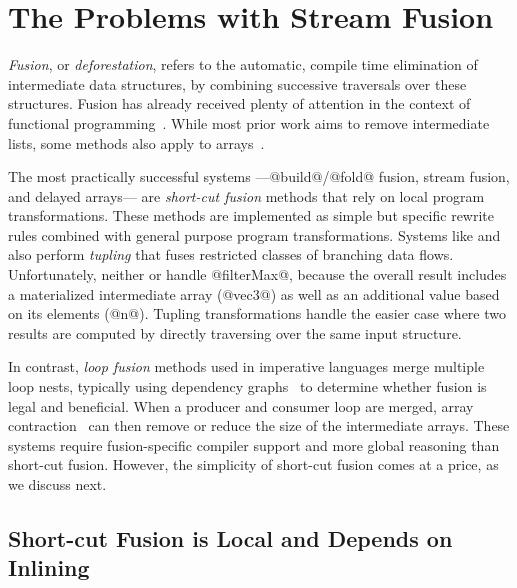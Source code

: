 \section{The Problems with Stream Fusion}
\label{s:Problems}

\emph{Fusion}, or \emph{deforestation}, refers to the automatic, compile time elimination of intermediate data structures, by combining successive traversals over these structures. Fusion has already received plenty of attention in the context of functional programming~\cite{Wadler:listnessness,Meijer:bananas,Waters:series-expressions,Gill:short-cut,Coutts:stream-fusion,Hu:Tupling,Romph:Scala}. While most prior work aims to remove intermediate lists, some methods also apply to arrays~\cite{Chakravarty:functional-array-fusion,Keller:Repa,Claessen:push-arrays,Grelck:with-loop-fusion}.

The most practically successful systems ---@build@/@fold@ fusion, stream fusion, and delayed arrays--- are \emph{short-cut fusion} methods that rely on local program transformations. These methods are implemented as simple but specific rewrite rules combined with general purpose program transformations. Systems like \cite{Hu:Tupling} and \cite{Grelck:with-loop-fusion} also perform \emph{tupling} that fuses restricted classes of branching data flows. Unfortunately, neither \cite{Hu:Tupling} or \cite{Grelck:with-loop-fusion} handle @filterMax@, because the overall result includes a materialized intermediate array (@vec3@) as well as an additional value based on its elements (@n@). Tupling transformations handle the easier case where two results are computed by directly traversing over the same input structure.

In contrast, \emph{loop fusion} methods used in imperative languages merge multiple loop nests, typically using dependency graphs~\cite{Warren:reordering} to determine whether fusion is legal and beneficial. When a producer and consumer loop are merged, array contraction~\cite{Sarkar:loop-transformations} can then remove or reduce the size of the intermediate arrays. These systems require fusion-specific compiler support and more global reasoning than short-cut fusion. However, the simplicity of short-cut fusion comes at a price, as we discuss next.


\subsection{Short-cut Fusion is Local and Depends on Inlining}
\label{s:short-cut-fusion}

